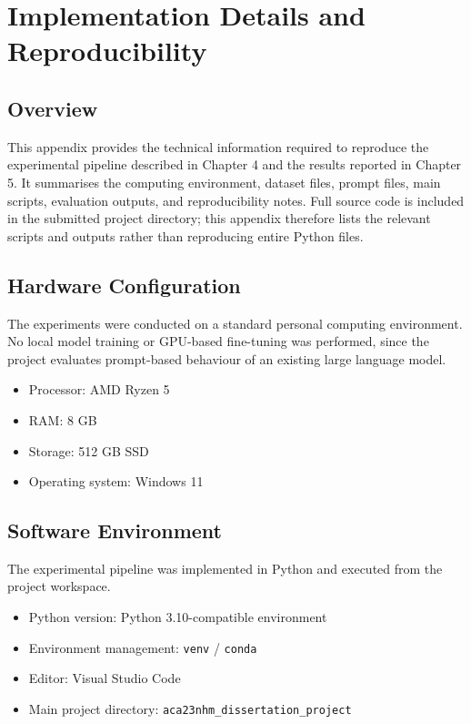 \appendix

\chapter{Implementation Details and Reproducibility}

\section{Overview}

This appendix provides the technical information required to reproduce the experimental pipeline described in Chapter 4 and the results reported in Chapter 5. It summarises the computing environment, dataset files, prompt files, main scripts, evaluation outputs, and reproducibility notes. Full source code is included in the submitted project directory; this appendix therefore lists the relevant scripts and outputs rather than reproducing entire Python files.

\section{Hardware Configuration}

The experiments were conducted on a standard personal computing environment. No local model training or GPU-based fine-tuning was performed, since the project evaluates prompt-based behaviour of an existing large language model.

\begin{itemize}
    \item Processor: AMD Ryzen 5
    \item RAM: 8 GB
    \item Storage: 512 GB SSD
    \item Operating system: Windows 11
\end{itemize}

\section{Software Environment}

The experimental pipeline was implemented in Python and executed from the project workspace.

\begin{itemize}
    \item Python version: Python 3.10-compatible environment
    \item Environment management: \texttt{venv} / \texttt{conda}
    \item Editor: Visual Studio Code
    \item Main project directory: \texttt{aca23nhm\_dissertation\_project}
\end{itemize}


